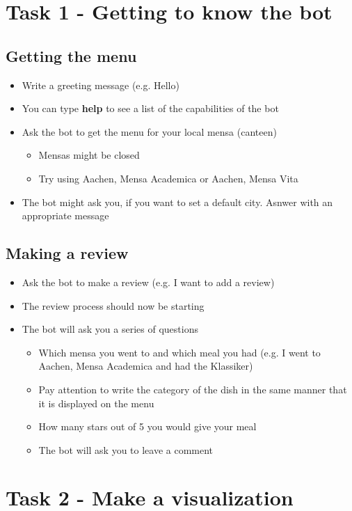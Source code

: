 \newpage
      
\section*{Task 1 - Getting to know the bot}
\subsection*{Getting the menu}
\begin{itemize}
    \item Write a greeting message (e.g. Hello)
    \item You can type \textbf{help} to see a list of the capabilities of the bot
    \item Ask the bot to get the menu for your local mensa (canteen)
    \begin{itemize}
      \item Mensas might be closed
      \item Try using Aachen, Mensa Academica or Aachen, Mensa Vita
    \end{itemize}
    \item The bot might ask you, if you want to set a default city. Asnwer with an appropriate message
\end{itemize}
\subsection*{Making a review}
\begin{itemize}
    \item Ask the bot to make a review (e.g. I want to add a review)
    \item The review process should now be starting 
    \item The bot will ask you a series of questions
    \begin{itemize}
      \item Which mensa you went to and which meal you had (e.g. I went to Aachen, Mensa Academica and had the Klassiker) 
      \item Pay attention to write the category of the dish in the same manner that it is displayed on the menu
      \item How many stars out of 5 you would give your meal
      \item The bot will ask you to leave a comment
    \end{itemize}
\end{itemize}

\section*{Task 2 - Make a visualization}

